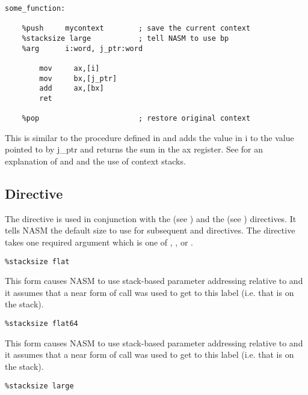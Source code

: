 \begin{lstlisting}
some_function:

    %push     mycontext        ; save the current context
    %stacksize large           ; tell NASM to use bp
    %arg      i:word, j_ptr:word

        mov     ax,[i]
        mov     bx,[j_ptr]
        add     ax,[bx]
        ret

    %pop                       ; restore original context
\end{lstlisting}

This is similar to the procedure defined in 
and adds the value in i to the value pointed to by j\_ptr and returns
the sum in the ax register. See  for an
explanation of  and  and the use of context stacks.

\subsection{ Directive}
\label{subsec:stacksize}

The  directive is used in conjunction with the
 (see ) and the 
(see ) directives. It tells NASM the default
size to use for subsequent  and  directives.
The  directive takes one required argument
which is one of , ,  or .

\begin{lstlisting}
%stacksize flat
\end{lstlisting}

This form causes NASM to use stack-based parameter addressing
relative to  and it assumes that a near form of call
was used to get to this label (i.e. that  is on the stack).

\begin{lstlisting}
%stacksize flat64
\end{lstlisting}

This form causes NASM to use stack-based parameter addressing
relative to  and it assumes that a near form of call was used
to get to this label (i.e. that  is on the stack).

\begin{lstlisting}
%stacksize large
\end{lstlisting}

